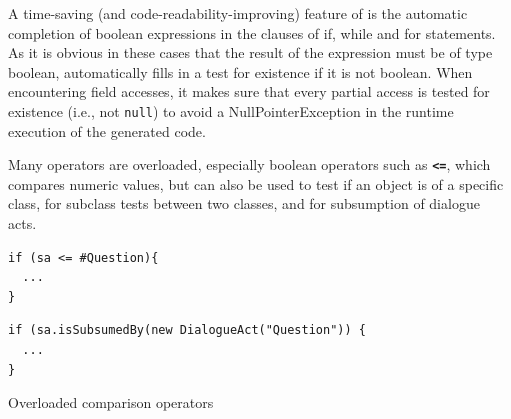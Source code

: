 
A time-saving (and code-readability-improving) feature of \vonda is the automatic completion of boolean expressions in the clauses of if, while and for statements. As it is obvious in these cases that the result of the expression must be of type boolean, \vonda automatically fills in a test for existence if it is not boolean. When encountering field accesses, it makes sure that every partial access is tested for existence (i.e., not \texttt{null}) to avoid a NullPointerException in the runtime execution of the generated code.


Many operators are overloaded, especially boolean operators such as
\textbf{\texttt{<=}}, which compares numeric values, but can also be used to test if an
object is of a specific class, for subclass tests between two classes, and for
subsumption of dialogue acts.

\begin{table}[htbp]
  \centering
  \begin{footnotesize}
    \begin{minipage}{0.28\textwidth}
\begin{lstlisting}
if (sa <= #Question){
  ...
}
\end{lstlisting}
    \end{minipage}\vline\hspace{1em}
    \begin{minipage}{0.5\textwidth}
\begin{lstlisting}
if (sa.isSubsumedBy(new DialogueAct("Question")) {
  ...
}
\end{lstlisting}
    \end{minipage}
  \end{footnotesize}

  \caption{Overloaded comparison operators}
  \label{tab:overloaded-comparison}
\end{table}

